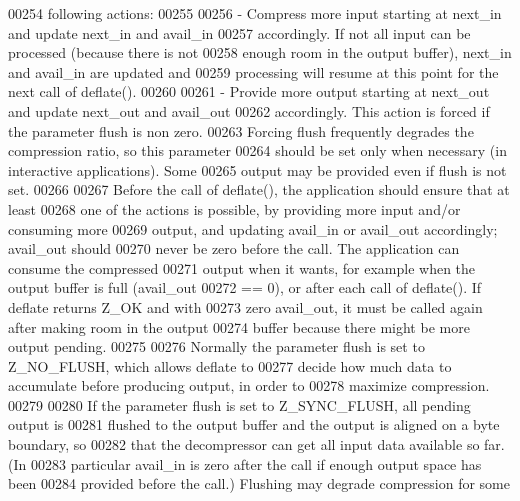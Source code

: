 \begin{DoxyCode}
00254 \textcolor{comment}{  following actions:}
00255 \textcolor{comment}{}
00256 \textcolor{comment}{  - Compress more input starting at next\_in and update next\_in and avail\_in}
00257 \textcolor{comment}{    accordingly.  If not all input can be processed (because there is not}
00258 \textcolor{comment}{    enough room in the output buffer), next\_in and avail\_in are updated and}
00259 \textcolor{comment}{    processing will resume at this point for the next call of deflate().}
00260 \textcolor{comment}{}
00261 \textcolor{comment}{  - Provide more output starting at next\_out and update next\_out and avail\_out}
00262 \textcolor{comment}{    accordingly.  This action is forced if the parameter flush is non zero.}
00263 \textcolor{comment}{    Forcing flush frequently degrades the compression ratio, so this parameter}
00264 \textcolor{comment}{    should be set only when necessary (in interactive applications).  Some}
00265 \textcolor{comment}{    output may be provided even if flush is not set.}
00266 \textcolor{comment}{}
00267 \textcolor{comment}{    Before the call of deflate(), the application should ensure that at least}
00268 \textcolor{comment}{  one of the actions is possible, by providing more input and/or consuming more}
00269 \textcolor{comment}{  output, and updating avail\_in or avail\_out accordingly; avail\_out should}
00270 \textcolor{comment}{  never be zero before the call.  The application can consume the compressed}
00271 \textcolor{comment}{  output when it wants, for example when the output buffer is full (avail\_out}
00272 \textcolor{comment}{  == 0), or after each call of deflate().  If deflate returns Z\_OK and with}
00273 \textcolor{comment}{  zero avail\_out, it must be called again after making room in the output}
00274 \textcolor{comment}{  buffer because there might be more output pending.}
00275 \textcolor{comment}{}
00276 \textcolor{comment}{    Normally the parameter flush is set to Z\_NO\_FLUSH, which allows deflate to}
00277 \textcolor{comment}{  decide how much data to accumulate before producing output, in order to}
00278 \textcolor{comment}{  maximize compression.}
00279 \textcolor{comment}{}
00280 \textcolor{comment}{    If the parameter flush is set to Z\_SYNC\_FLUSH, all pending output is}
00281 \textcolor{comment}{  flushed to the output buffer and the output is aligned on a byte boundary, so}
00282 \textcolor{comment}{  that the decompressor can get all input data available so far.  (In}
00283 \textcolor{comment}{  particular avail\_in is zero after the call if enough output space has been}
00284 \textcolor{comment}{  provided before the call.) Flushing may degrade compression for some}

\end{DoxyCode}
